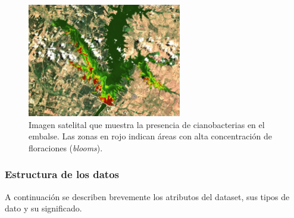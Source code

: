\documentclass[11pt]{report}
\begin{document}
\begin{figure}[h!]
    \centering
    \includegraphics[width=0.6\textwidth]{Imagenes/Cyano_en_lago.jpg}
    \caption{Imagen satelital que muestra la presencia de cianobacterias en el embalse. Las zonas en rojo indican áreas con alta concentración de floraciones (\textit{blooms}).}
    \label{fig:cyano_en_lago}
\end{figure}

\subsubsection{Estructura de los datos}

A continuación se describen brevemente los atributos del dataset, sus tipos de dato y su significado.
\end{document}
